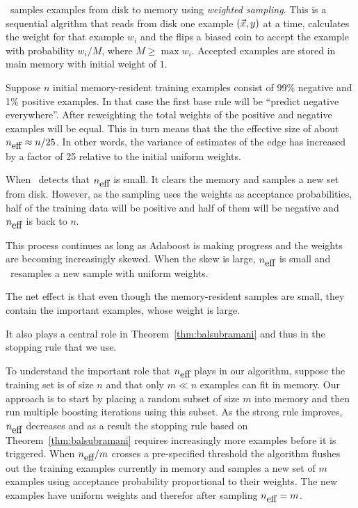 \Sparrow\ samples examples from disk to memory using {\em weighted
  sampling}. This is a sequential algrithm that reads from disk one
example $(\vec{x},y)$ at a time, calculates the weight for that example
$w_i$ and the flips a biased coin to accept the example with
probability $w_i/M$, where $M\geq \max w_i$. Accepted examples are
stored in main memory with initial weight of $1$.

Suppose $n$ initial memory-resident training examples consist of 99\%
negative and 1\% positive examples. In that case the first base rule
will be ``predict negative everywhere''. After reweighting the total
weights of the positive and negative examples will be equal. This in
turn means that the the effective size of about ${n_{\mbox{eff}}} \approx
n/25$. In other words, the variance of estimates of the edge has
increased by a factor of 25 relative to the initial uniform weights.

When \Sparrow\ detects that ${n_{\mbox{eff}}}$ is small. It clears the memory and
samples a new set from disk. However, as the sampling uses the weights
as acceptance probabilities, half of the training data will be
positive and half of them will be negative and ${n_{\mbox{eff}}}$ is back to $n$.

This process continues as long as Adaboost is making progress and the
weights are becoming increasingly skewed. When the skew is large,
${n_{\mbox{eff}}}$ is small and \Sparrow\ resamples a new sample with uniform
weights.

The net effect is that even though the memory-resident samples are
small, they contain the important examples, whose weight is large.

It also plays
a central role in Theorem~\ref{thm:balsubramani} and thus in the
stopping rule that we use.

To understand the important role that ${n_{\mbox{eff}}}$ plays in our algorithm,
suppose the training set is of size $n$ and that only $m \ll n$
examples can fit in memory. Our approach is to start by placing a
random subset of size $m$ into memory and then run multiple
boosting iterations using this subset. As the strong rule improves,
${n_{\mbox{eff}}}$ decreases and as a result the stopping rule based on
Theorem~\ref{thm:balsubramani} requires increasingly more examples
before it is triggered. When ${n_{\mbox{eff}}}/m$ crosses a pre-specified
threshold the algorithm flushes out the training examples currently in
memory and samples a new set of $m$ examples using acceptance
probability proportional to their weights. The new examples have
uniform weights and therefor after sampling ${n_{\mbox{eff}}}=m$.

